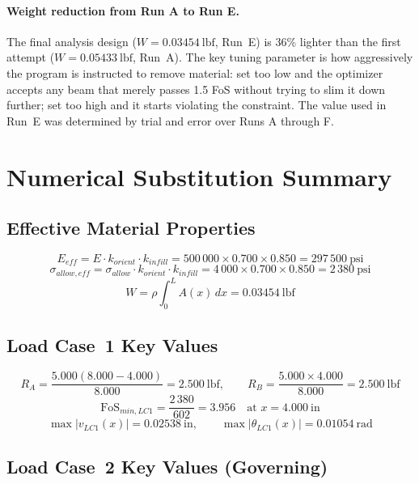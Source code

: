 \documentclass[11pt,letterpaper]{article}
\begin{document}
\paragraph{Weight reduction from Run A to Run E.}
The final analysis design ($W = 0.03454\ \mathrm{lbf}$, Run~E) is 36\% lighter
than the first attempt ($W = 0.05433\ \mathrm{lbf}$, Run~A).
The key tuning parameter is how aggressively the program is instructed to remove
material: set too low and the optimizer accepts any beam that merely passes 1.5 FoS
without trying to slim it down further; set too high and it starts violating the
constraint.  The value used in Run~E was determined by trial and error over Runs A
through F.


\section{Numerical Substitution Summary}
\label{sec:substitution}

\subsection{Effective Material Properties}

\[
  E_{eff} = E \cdot k_{orient} \cdot k_{infill}
  = 500\,000 \times 0.700 \times 0.850 = 297\,500\ \mathrm{psi}
\]
\[
  \sigma_{allow,eff} = \sigma_{allow} \cdot k_{orient} \cdot k_{infill}
  = 4\,000 \times 0.700 \times 0.850 = 2\,380\ \mathrm{psi}
\]
\[
  W = \rho \int_0^L A(x)\,dx = 0.03454\ \mathrm{lbf}
\]

\subsection{Load Case~1 Key Values}

\[
  R_A = \frac{5.000(8.000 - 4.000)}{8.000} = 2.500\ \mathrm{lbf},
  \qquad
  R_B = \frac{5.000 \times 4.000}{8.000} = 2.500\ \mathrm{lbf}
\]
\[
  \mathrm{FoS}_{min,LC1}
  = \frac{2\,380}{602} = 3.956
  \quad \text{at } x = 4.000\ \mathrm{in}
\]
\[
  \max|v_{LC1}(x)| = 0.02538\ \mathrm{in},
  \qquad
  \max|\theta_{LC1}(x)| = 0.01054\ \mathrm{rad}
\]

\subsection{Load Case~2 Key Values (Governing)}
\end{document}
